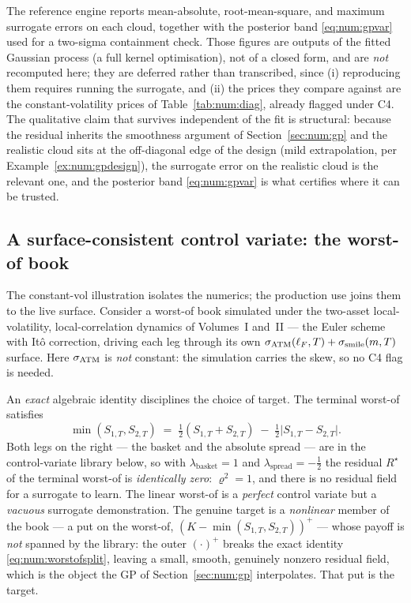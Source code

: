 \begin{remark}\label{rem:num:deferred}
The reference engine reports mean-absolute, root-mean-square, and maximum
surrogate errors on each cloud, together with the posterior band
\eqref{eq:num:gpvar} used for a two-sigma containment check. Those figures are
outputs of the fitted Gaussian process (a full kernel optimisation), not of a
closed form, and are \emph{not} recomputed here; they are deferred rather than
transcribed, since (i) reproducing them requires running the surrogate, and
(ii) the prices they compare against are the constant-volatility prices of
Table~\ref{tab:num:diag}, already flagged under C4. The qualitative claim that
survives independent of the fit is structural: because the residual inherits the
smoothness argument of Section~\ref{sec:num:gp} and the realistic cloud sits at
the off-diagonal edge of the design (mild extrapolation, per
Example~\ref{ex:num:gpdesign}), the surrogate error on the realistic cloud is
the relevant one, and the posterior band \eqref{eq:num:gpvar} is what certifies
where it can be trusted.
\end{remark}

\subsection{A surface-consistent control variate: the worst-of book}
\label{sec:num:worstof}

The constant-vol illustration isolates the numerics; the production use joins
them to the live surface. Consider a worst-of book simulated under the two-asset
local-volatility, local-correlation dynamics of Volumes~I and~II --- the Euler
scheme with It\^o correction, driving each leg through its own
$\sigma_{\mathrm{ATM}}(\ell_F,T) + \sigma_{\mathrm{smile}}(m,T)$ surface. Here $\sigma_{\mathrm{ATM}}$ is \emph{not} constant: the
simulation carries the skew, so no C4 flag is needed.

An \emph{exact} algebraic identity disciplines
the choice of target. The terminal worst-of satisfies
\begin{equation}\label{eq:num:worstofsplit}
   \min(S_{1,T}, S_{2,T})
   \;=\; \tfrac12(S_{1,T} + S_{2,T}) \;-\; \tfrac12\bigl|S_{1,T} - S_{2,T}\bigr|.
\end{equation}
Both legs on the right --- the basket and the absolute spread --- are in the
control-variate library below, so with $\lambda_{\mathrm{basket}} = 1$ and
$\lambda_{\mathrm{spread}} = -\tfrac12$ the residual $R^\star$ of the terminal
worst-of is \emph{identically zero}: $\varrho^2 = 1$, and there is no residual
field for a surrogate to learn. The linear worst-of is a \emph{perfect} control
variate but a \emph{vacuous} surrogate demonstration. The genuine target is a
\emph{nonlinear} member of the book --- a put on the worst-of,
$(K - \min(S_{1,T},S_{2,T}))^+$ --- whose payoff is \emph{not} spanned by the
library: the outer $(\cdot)^+$ breaks the exact identity \eqref{eq:num:worstofsplit},
leaving a small, smooth, genuinely nonzero residual field, which is the object the
GP of Section~\ref{sec:num:gp} interpolates. That put is the target.

